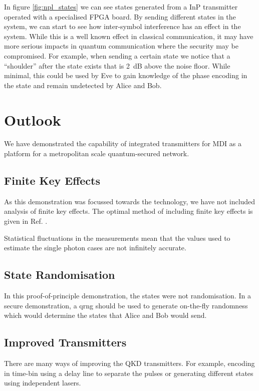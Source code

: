 In figure \ref{fig:npl_states} we can see states generated from a \ac{InP} transmitter operated with a specialised FPGA board. By sending different states in the system, we can start to see how inter-symbol interference has an effect in the system. While this is a well known effect in classical communication, it may have more serious impacts in quantum communication where the security may be compromised. For example, when sending a certain state we notice that a ``shoulder'' after the state exists that is \SI{2}{dB} above the noise floor. While minimal, this could be used by Eve to gain knowledge of the phase encoding in the state and remain undetected by Alice and Bob.

\section{Outlook}

We have demonstrated the capability of integrated transmitters for \acl{MDI} as a platform for a metropolitan scale quantum-secured network. 

\subsection{Finite Key Effects}

As this demonstration was focussed towards the technology, we have not included analysis of finite key effects. The optimal method of including finite key effects is given in Ref. \cite{zhou2016}.

Statistical fluctuations in the measurements mean that the values used to estimate the single photon cases are not infinitely accurate. 

\subsection{State Randomisation}

In this proof-of-principle demonstration, the states were not randomisation. In a secure demonstration, a \ac{qrng} should be used to generate on-the-fly randomness which would determine the states that Alice and Bob would send. 

\subsection{Improved Transmitters}

There are many ways of improving the QKD transmitters. For example, encoding in time-bin using a delay line to separate the pulses or generating different states using independent lasers.

